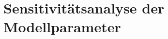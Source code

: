 \pagestyle{milan}
\section{Sensitivitätsanalyse der Modellparameter} \label{sec:sesitivitaetsanalyse}
